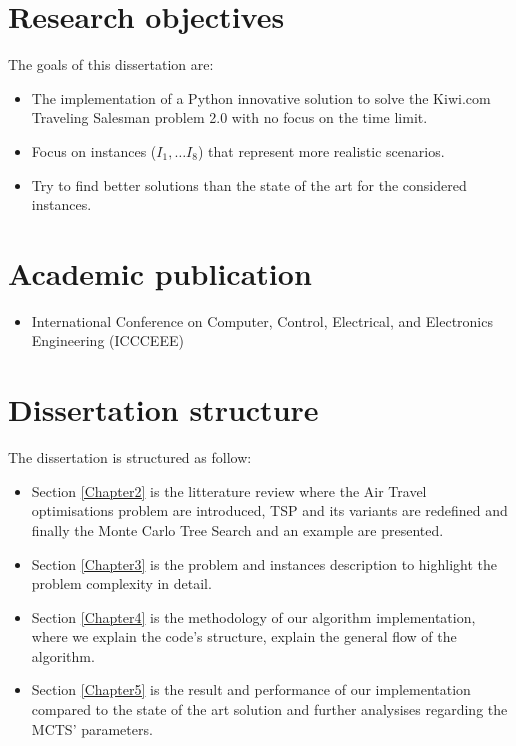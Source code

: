\section{Research objectives}
\label{section:research_obj}
The goals of this dissertation are:
\begin{itemize}
    \item The implementation of a Python innovative solution to solve the Kiwi.com Traveling Salesman problem 2.0 with no focus on the time limit.
    \item Focus on instances ($I_1,\ldots I_8$) that represent more realistic scenarios.
    \item Try to find better solutions than the state of the art for the considered instances.

\end{itemize}

\section{Academic publication}
\begin{itemize}
    \item International Conference on Computer, Control, Electrical, and Electronics Engineering (ICCCEEE)
\end{itemize}

\section{Dissertation structure}

The dissertation is structured as follow:
\begin{itemize}
    \item Section \ref{Chapter2} is the litterature review where the Air Travel optimisations problem are introduced, TSP and its variants are redefined and finally the Monte Carlo Tree Search and an example are presented.
    \item Section \ref{Chapter3} is the problem and instances description to highlight the problem complexity in detail.
    \item Section \ref{Chapter4} is the methodology of our algorithm implementation, where we explain the code's structure, explain the general flow of the algorithm.
    \item Section \ref{Chapter5} is the result and performance of our implementation compared to the state of the art solution and further analysises regarding the MCTS' parameters.
\end{itemize}

